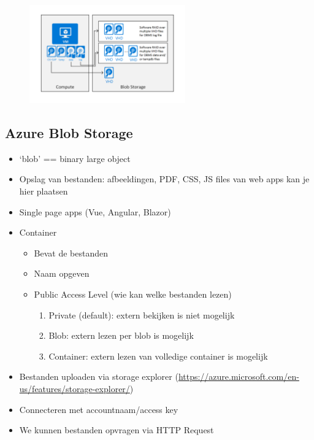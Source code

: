 \documentclass{article}
\begin{document}
\begin{figure}[H]
    \centering
    \includegraphics[width=0.6\textwidth]{azure-storage-disk.png}
    \caption{}
\end{figure}

\subsection{Azure Blob Storage}

\begin{itemize}
    \item `blob' == binary large object
    \item Opslag van bestanden: afbeeldingen, PDF, CSS, JS files van web apps kan je hier plaatsen
    \item Single page apps (Vue, Angular, Blazor)
    \item Container
    \begin{itemize}
        \item Bevat de bestanden
        \item Naam opgeven
        \item Public Access Level (wie kan welke bestanden lezen)
        \begin{enumerate}
            \item Private (default): extern bekijken is niet mogelijk
            \item Blob: extern lezen per blob is mogelijk
            \item Container: extern lezen van volledige container is mogelijk
        \end{enumerate}
    \end{itemize}
    \item Bestanden uploaden via storage explorer (\url{https://azure.microsoft.com/en-us/features/storage-explorer/})
    \item Connecteren met accountnaam/access key
    \item We kunnen bestanden opvragen via HTTP Request
\end{itemize}
\end{document}
